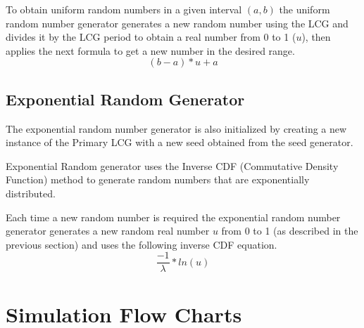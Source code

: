 \documentclass[aps,letterpaper,10pt]{revtex4}
\begin{document}
    To obtain uniform random numbers in a given interval $(a,b)$ the uniform
    random number generator generates a new random number using the LCG and
    divides it by the LCG period to obtain a real number from 0 to 1 ($u$), then
    applies the next formula to get a new number in the desired range.
    \[(b-a)*u + a\]
\subsection{Exponential Random Generator}
    The exponential random number generator is also initialized by creating a
    new instance of the Primary LCG with a new seed obtained from the seed
    generator.

    Exponential Random generator uses the Inverse CDF (Commutative Density
    Function) method to generate random numbers that are exponentially
    distributed.

    Each time a new random number is required the exponential random number
    generator generates a new random real number $u$ from 0 to 1 (as described in
    the previous section) and uses the following inverse CDF equation.
    \[\frac{-1}{\lambda} * ln (u)\]



\newpage
\section{Simulation Flow Charts}

\begin{figure}[htp]
    \begin{center}
    \end{center}
\end{figure}
\end{document}
